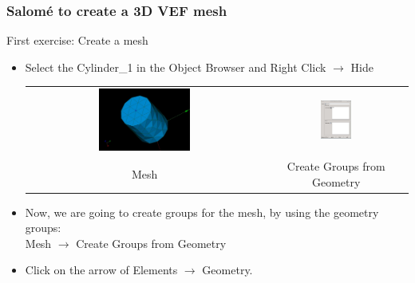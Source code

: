 \documentclass[10pt]{beamer}
\begin{document}
\begin{frame}
\frametitle{Salom\'e to create a 3D VEF mesh}
\begin{block}{First exercise: Create a mesh}

\begin{itemize}
\item Select the Cylinder\_1 in the Object Browser and Right Click $\rightarrow$ Hide

\begin{tabular}{cc}
\includegraphics[width=0.4\textwidth]{PICTURES/salome4} & \includegraphics[width=0.23\textwidth]{PICTURES/salome5}\tabularnewline
Mesh & Create Groups from Geometry \tabularnewline
\end{tabular}

\item Now, we are going to create groups for the mesh, by using the geometry groups: \\
Mesh $\rightarrow$ Create Groups from Geometry

\item Click on the arrow of Elements $\rightarrow$ Geometry.
\end{itemize}

\end{block}
\end{frame}
\end{document}

